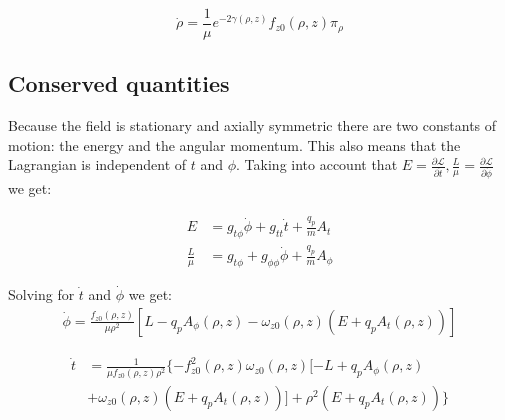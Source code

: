 \documentclass[%
 reprint,
 amsmath,amssymb,
 aps,
]{revtex4-1}
\begin{document}
\begin{equation}
\dot{\rho}=\frac{1}{\mu}e^{-2\gamma(\rho,z)}f_{z0}(\rho,z)\pi_\rho
\end{equation}

\subsection{Conserved quantities}
Because the field is stationary and axially symmetric there are two constants of motion: the energy and the angular momentum. This also means that the Lagrangian is independent of $t$ and $\phi$.  Taking into account that $E=\frac{\partial \mathcal{L}}{\partial \dot{t}}, \frac{L}{\mu}=\frac{\partial \mathcal{L}}{\partial \dot{\phi}}$ we get:

\begin{equation}
\begin{split}
E&=g_{t\phi}\dot{\phi}+g_{tt}\dot{t}+\frac{q_p}{m}A_t \\
\frac{L}{\mu}&=g_{t\phi}+g_{\phi\phi}\dot{\phi}+\frac{q_p}{m}A_{\phi}
\end{split}
\end{equation}

Solving for $\dot{t}$ and $\dot{\phi}$ we get:
\begin{equation}
\begin{split}
\dot{\phi}=\frac{f_{z0}(\rho,z)}{\mu\rho^2}[L-q_pA_\phi(\rho,z)-\omega_{z0}(\rho,z)(E+q_pA_t(\rho,z))]
\end{split}
\end{equation}

\begin{equation}
\begin{split}
\dot{t}&=\frac{1}{\mu f_{z0}(\rho,z)\rho^2}\{-f_{z0}^2(\rho,z)\omega_{z0}(\rho,z)[-L+q_pA_\phi(\rho,z)\\
& +\omega_{z0}(\rho,z)(E+q_pA_t(\rho,z))]+\rho^2(E+q_pA_t(\rho,z))\}
\end{split}
\end{equation}
\end{document}
